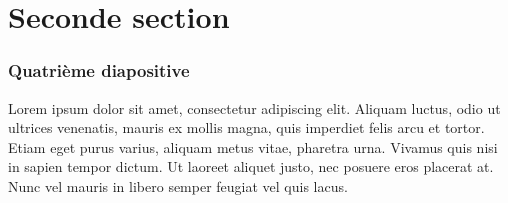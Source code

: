 \documentclass[xcolor=table]{beamer}
\begin{document}
\section{Seconde section}
\begin{frame}
\frametitle{Quatrième diapositive}

Lorem ipsum dolor sit amet, consectetur adipiscing elit. Aliquam luctus, odio ut ultrices venenatis, mauris ex mollis magna, quis imperdiet felis arcu et tortor. Etiam eget purus varius, aliquam metus vitae, pharetra urna. Vivamus quis nisi in sapien tempor dictum. Ut laoreet aliquet justo, nec posuere eros placerat at. Nunc vel mauris in libero semper feugiat vel quis lacus.

\end{frame}
\end{document}
